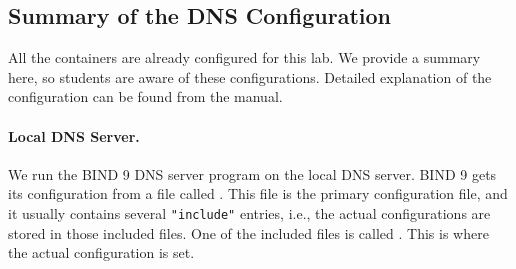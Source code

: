

\subsection{Summary of the DNS Configuration} 

All the containers are already configured for this lab. 
We provide a summary here, so students are aware of 
these configurations. Detailed explanation
of the configuration can be found from the manual.



\paragraph{Local DNS Server.} 
We run the BIND 9 DNS server program on the local DNS server. 
BIND 9 gets its configuration from a file called . This file
is the primary configuration file, and it usually contains several \texttt{"include"}
entries, i.e., the actual configurations are stored in those included files. One of the
included files is called . 
This is where the actual configuration is set. 


